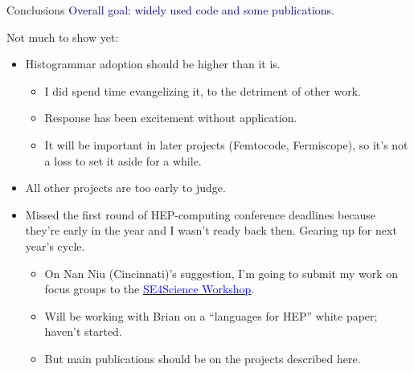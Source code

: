 \begin{frame}{Conclusions}
\vspace{0.5 cm}
\textcolor{darkblue}{Overall goal: widely used code and some publications.}

\vspace{0.25 cm}
Not much to show yet:

\begin{itemize}
\item Histogrammar adoption should be higher than it is.
\begin{itemize}
\item I did spend time evangelizing it, to the detriment of other work.
\item Response has been excitement without application.
\item It will be important in later projects (Femtocode, Fermiscope), so it's not a loss to set it aside for a while.
\end{itemize}

\item All other projects are too early to judge.

\item Missed the first round of HEP-computing conference deadlines because they're early in the year and I wasn't ready back then. Gearing up for next year's cycle.
\begin{itemize}
\item On Nan Niu (Cincinnati)'s suggestion, I'm going to submit my work on focus groups to the \href{http://se4science.org/workshops/}{\textcolor{blue}{SE4Science Workshop}}.
\item Will be working with Brian on a ``languages for HEP'' white paper; haven't started.
\item But main publications should be on the projects described here.
\end{itemize}
\end{itemize}
\end{frame}

